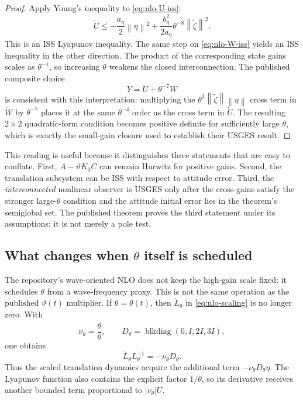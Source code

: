 \documentclass[conference]{IEEEtran}
\newcommand{\norm}[1]{\left\lVert#1\right\rVert}
\newcommand{\abs}[1]{\left|#1\right|}
\DeclareMathOperator{\blkdiag}{blkdiag}
\theoremstyle{remark}
\begin{document}
\begin{proof}
Apply Young's inequality to \eqref{eq:nlo-U-iss}:
\begin{equation}
 \dot U\le-\frac{a_\eta}{2}\norm\eta^2
 +\frac{b_\eta^2}{2a_\eta}\theta^{-8}
  \norm{\tilde\zeta}^2.
 \label{eq:nlo-U-young}
\end{equation}
This is an ISS Lyapunov inequality.  The same step on
\eqref{eq:nlo-W-iss} yields an ISS inequality in the other direction.  The
product of the corresponding state gains scales as $\theta^{-1}$, so increasing
$\theta$ weakens the closed interconnection.  The published composite choice
\begin{equation}
 Y=U+\theta^{-7}W
 \label{eq:nlo-composite}
\end{equation}
is consistent with this interpretation: multiplying the
$\theta^3\norm{\tilde\zeta}\norm\eta$ cross term in $\dot W$ by
$\theta^{-7}$ places it at the same $\theta^{-4}$ order as the cross term in
$\dot U$.  The resulting $2\times2$ quadratic-form condition becomes positive
definite for sufficiently large $\theta$, which is exactly the small-gain
closure used to establish their USGES result.
\end{proof}

This reading is useful because it distinguishes three statements that are easy
to conflate.  First, $A-\vartheta K_0C$ can remain Hurwitz for positive gains.
Second, the translation subsystem can be ISS with respect to attitude error.
Third, the \emph{interconnected} nonlinear observer is USGES only after the
cross-gains satisfy the stronger large-$\theta$ condition and the attitude
initial error lies in the theorem's semiglobal set.  The published theorem
proves the third statement under its assumptions; it is not merely a pole test.

\subsection{What changes when $\theta$ itself is scheduled}
The repository's wave-oriented NLO does not keep the high-gain scale fixed: it
schedules $\theta$ from a wave-frequency proxy.  This is not the same operation
as the published $\vartheta(t)$ multiplier.  If $\theta=\theta(t)$, then
$\dot L_\theta$ in \eqref{eq:nlo-scaling} is no longer zero.  With
\begin{equation}
 \nu_\theta=\frac{\dot\theta}{\theta},
 \qquad
 D_\theta=\blkdiag(0,I,2I,3I),
\end{equation}
one obtains
\begin{equation}
 \dot L_\theta L_\theta^{-1}=-\nu_\theta D_\theta.
 \label{eq:nlo-Ldot}
\end{equation}
Thus the scaled translation dynamics acquire the additional term
$-\nu_\theta D_\theta\eta$.  The Lyapunov function also contains the explicit
factor $1/\theta$, so its derivative receives another bounded term proportional
to $\abs{\nu_\theta}U$.
\end{document}
